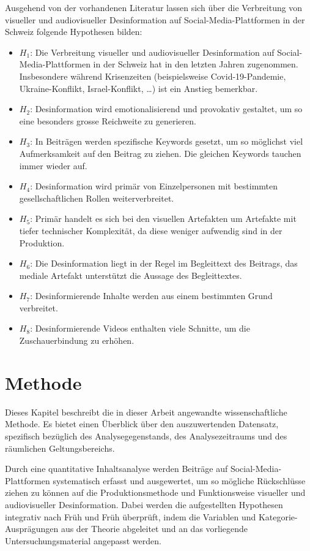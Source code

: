 \documentclass[12pt,a4paper]{article}        %
\begin{document}
Ausgehend von der vorhandenen Literatur lassen sich über die Verbreitung von visueller und audiovisueller Desinformation auf Social-Media-Plattformen in der Schweiz folgende Hypothesen bilden:
\begin{itemize}
  \item \textbf{\(H_1\)}: Die Verbreitung visueller und audiovisueller Desinformation auf Social-Media-Plattformen in der Schweiz hat in den letzten Jahren zugenommen. Insbesondere während Krisenzeiten (beispielsweise Covid-19-Pandemie, Ukraine-Konflikt, Israel-Konflikt, …) ist ein Anstieg bemerkbar.
  \item \textbf{\(H_2\)}: Desinformation wird emotionalisierend und provokativ gestaltet, um so eine besonders grosse Reichweite zu generieren.
  \item \textbf{\(H_3\)}:  In Beiträgen werden spezifische Keywords gesetzt, um so möglichst viel Aufmerksamkeit auf den Beitrag zu ziehen. Die gleichen Keywords tauchen immer wieder auf.

    \pagebreak
  \item \textbf{\(H_4\)}:  Desinformation wird primär von Einzelpersonen mit bestimmten gesellschaftlichen Rollen weiterverbreitet.
  \item \textbf{\(H_5\)}:  Primär handelt es sich bei den visuellen Artefakten um Artefakte mit tiefer technischer Komplexität, da diese weniger aufwendig sind in der Produktion.
  \item \textbf{\(H_6\)}:  Die Desinformation liegt in der Regel im Begleittext des Beitrags, das mediale Artefakt unterstützt die Aussage des Begleittextes.
  \item \textbf{\(H_7\)}:  Desinformierende Inhalte werden aus einem bestimmten Grund verbreitet.
  \item \textbf{\(H_8\)}:  Desinformierende Videos enthalten viele Schnitte, um die Zuschauerbindung zu erhöhen.
\end{itemize}

\pagebreak
\section{Methode}
\label{sec:method}
Dieses Kapitel beschreibt die in dieser Arbeit angewandte wissenschaftliche Methode. Es bietet einen Überblick über den auszuwertenden Datensatz, spezifisch bezüglich des Analysegegenstands, des Analysezeitraums und des räumlichen Geltungsbereichs.

Durch eine quantitative Inhaltsanalyse werden Beiträge auf Social-Media-Plattformen systematisch erfasst und ausgewertet, um so mögliche Rückschlüsse ziehen zu können auf die Produktionsmethode und Funktionsweise visueller und audiovisueller Desinformation. Dabei werden die aufgestellten Hypothesen integrativ nach Früh und Früh \parencite[zit.\ nach][13]{kessler_manuelle_2023}  überprüft, indem die Variablen und Kategorie-Ausprägungen aus der Theorie abgeleitet und an das vorliegende Untersuchungsmaterial angepasst werden.
\end{document}
